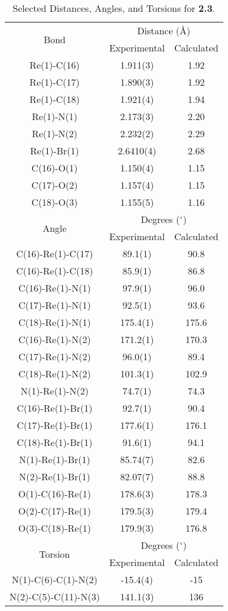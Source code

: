 \begin{table}[htb]
  \caption{Selected Distances, Angles, and Torsions for \textbf{2.3}.}
  \centering
    \begin{tabular}{ccc}
    \toprule
   \multirow{2}{*}{Bond} & \multicolumn{2}{c}{Distance (\r{A})} \\ \cline{2-3}
     & Experimental & Calculated \\ \midrule
    Re(1)-C(16) & 1.911(3) & 1.92 \\
    Re(1)-C(17) & 1.890(3) & 1.92 \\
    Re(1)-C(18) & 1.921(4) & 1.94 \\
    Re(1)-N(1) & 2.173(3) & 2.20 \\
    Re(1)-N(2) & 2.232(2) & 2.29 \\
    Re(1)-Br(1) & 2.6410(4) & 2.68 \\ 
    C(16)-O(1) & 1.150(4) & 1.15 \\
    C(17)-O(2) & 1.157(4) & 1.15 \\
    C(18)-O(3) & 1.155(5) & 1.16 \\ \midrule
    \multirow{2}{*}{Angle} & \multicolumn{2}{c}{Degrees ($^\circ$)} \\ \cline{2-3}
     & Experimental & Calculated \\ \midrule
    C(16)-Re(1)-C(17) & 89.1(1) & 90.8 \\
    C(16)-Re(1)-C(18) & 85.9(1) & 86.8 \\
    C(16)-Re(1)-N(1) & 97.9(1) & 96.0 \\
    C(17)-Re(1)-N(1) & 92.5(1) & 93.6 \\
    C(18)-Re(1)-N(1) & 175.4(1) & 175.6 \\
    C(16)-Re(1)-N(2) & 171.2(1) & 170.3 \\
    C(17)-Re(1)-N(2) & 96.0(1) & 89.4 \\
    C(18)-Re(1)-N(2) & 101.3(1) & 102.9 \\
    N(1)-Re(1)-N(2) & 74.7(1) & 74.3 \\
    C(16)-Re(1)-Br(1) & 92.7(1) & 90.4 \\
    C(17)-Re(1)-Br(1) & 177.6(1) & 176.1 \\
    C(18)-Re(1)-Br(1) & 91.6(1) & 94.1 \\
    N(1)-Re(1)-Br(1) & 85.74(7) & 82.6 \\
    N(2)-Re(1)-Br(1) & 82.07(7) & 88.8 \\
    O(1)-C(16)-Re(1) & 178.6(3) & 178.3 \\
    O(2)-C(17)-Re(1) & 179.5(3) & 179.4 \\
    O(3)-C(18)-Re(1) & 179.9(3) & 176.8 \\\midrule
    \multirow{2}{*}{Torsion} & \multicolumn{2}{c}{Degrees ($^\circ$)} \\ \cline{2-3}
     & Experimental & Calculated \\ \midrule
    N(1)-C(6)-C(1)-N(2) & -15.4(4) & -15 \\
    N(2)-C(5)-C(11)-N(3) & 141.1(3) & 136 \\
    \bottomrule
    \end{tabular}%
  \label{tab.da3}%
\end{table}%


